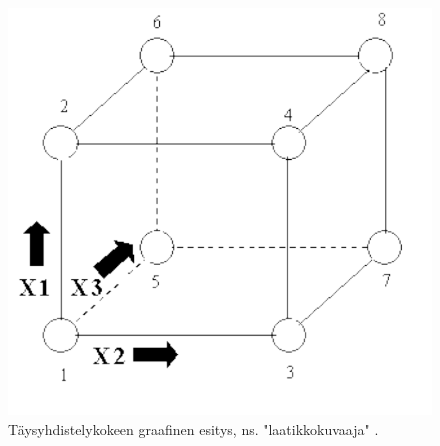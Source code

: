 \documentclass[12pt,a4paper,finnish]{tutthesis}
\begin{document}






\begin{figure}[h]
  \begin{center}
    \includegraphics[scale=0.6]{cube}
  \end{center}
  \caption[Laatikkokuvaaja]{Täysyhdistelykokeen graafinen esitys, ns. "laatikkokuvaaja" \parencite{ehandbook}.}
  \label{fig:cube}
\end{figure}
\end{document}
